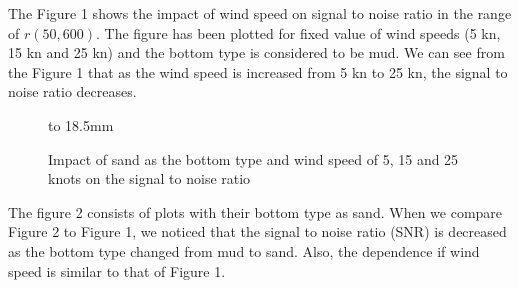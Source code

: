 \noindent The Figure 1 shows the impact of wind speed on signal to noise ratio in the range of $\textit{r} (50, 600).$ The figure has been plotted for fixed value of wind speeds (5 kn, 15 kn and 25 kn) and the bottom type is considered to be mud. We can see from the Figure 1 that as the wind speed is increased from 5 kn to 25 kn, the signal to noise ratio decreases.

\begin{figure}[h]
\centering
{}
\newline
\hbox to 18.5mm{}%
\caption{Impact of sand as the bottom type and wind speed of 5, 15 and 25 knots on the signal to noise ratio}
\end{figure}

\noindent The figure 2 consists of plots with their bottom type as sand. When we compare Figure 2 to Figure 1, we noticed that the signal to noise ratio (SNR) is decreased as the bottom type changed from mud to sand. Also, the dependence if wind speed is similar to that of Figure 1. 

